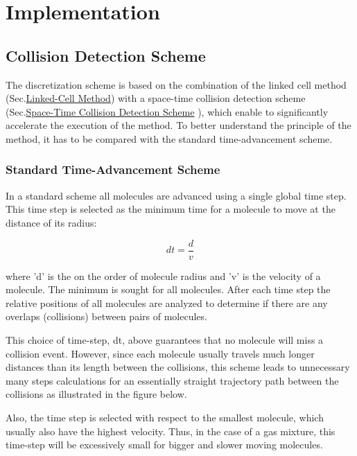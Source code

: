 \hypertarget{Implementation_SecImpl}{}\section{Implementation}\label{Implementation_SecImpl}
\hypertarget{Implementation_SColDet}{}\subsection{Collision Detection Scheme}\label{Implementation_SColDet}
The discretization scheme is based on the combination of the linked cell method (Sec.\hyperlink{Implementation_SLinkCell}{Linked-Cell Method}) with a space-time collision detection scheme (Sec.\hyperlink{Implementation_STDetAlg}{Space-Time Collision Detection Scheme} ), which enable to significantly accelerate the execution of the method. To better understand the principle of the method, it has to be compared with the standard time-advancement scheme.\hypertarget{Implementation_StdAlg}{}\subsubsection{Standard Time-Advancement Scheme}\label{Implementation_StdAlg}
In a standard scheme all molecules are advanced using a single global time step. This time step is selected as the minimum time for a molecule to move at the distance of its radius:

\[ dt = \frac{d}{v} \]

where 'd' is the on the order of molecule radius and 'v' is the velocity of a molecule. The minimum is sought for all molecules. After each time step the relative positions of all molecules are analyzed to determine if there are any overlaps (collisions) between pairs of molecules.

This choice of time-step, dt, above guarantees that no molecule will miss a collision event. However, since each molecule usually travels much longer distances than its length between the collisions, this scheme leads to unnecessary many steps calculations for an essentially straight trajectory path between the collisions as illustrated in the figure below.



Also, the time step is selected with respect to the smallest molecule, which usually also have the highest velocity. Thus, in the case of a gas mixture, this time-step will be excessively small for bigger and slower moving molecules.

